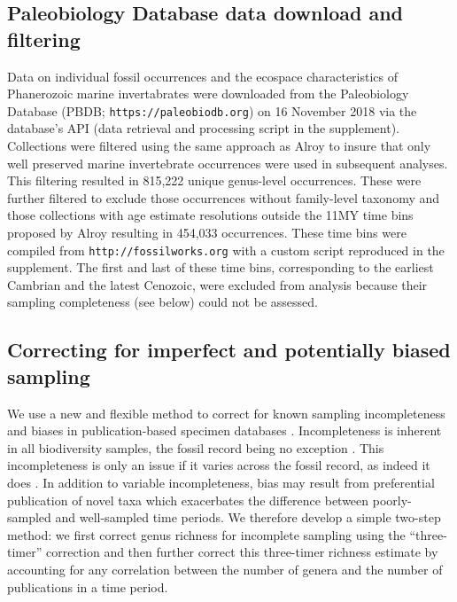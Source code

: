 \documentclass[12pt]{article}
\let\citep=\cite
\begin{document}
\subsection{Paleobiology Database data download and filtering}
Data on individual fossil occurrences and the ecospace characteristics
of Phanerozoic marine invertabrates were downloaded from the
Paleobiology Database (PBDB; {\tt https://paleobiodb.org}) on 16
November 2018 via the database's API (data retrieval and processing
script in the supplement). Collections were filtered using the same
approach as Alroy \citep{alroy08} to insure that only well preserved
marine invertebrate occurrences were used in subsequent analyses. This
filtering resulted in 815,222 unique genus-level occurrences. These
were further filtered to exclude those occurrences without
family-level taxonomy and those collections with age estimate
resolutions outside the 11MY time bins proposed by Alroy
\citep{alroy08} resulting in 454,033 occurrences. These time bins were
compiled from {\tt http://fossilworks.org} with a custom script
reproduced in the supplement. The first and last of these time bins,
corresponding to the earliest Cambrian and the latest Cenozoic, were
excluded from analysis because their sampling completeness (see below)
could not be assessed.


\subsection{Correcting for imperfect and potentially biased sampling}
\label{sec:3TP}
We use a new and flexible method to correct for known sampling
incompleteness and biases in publication-based specimen databases
\citep{alroy08, alroy2010}. Incompleteness is inherent in all
biodiversity samples, the fossil record being no exception
\citep{miller1996, foote2016, starrfelt2016, close2018}. This
incompleteness is only an issue if it varies across the fossil record,
as indeed it does \citep{miller1996 , foote2016, starrfelt2016,
  close2018}.  In addition to variable incompleteness, bias may result
from preferential publication of novel taxa \citep{alroy2010} which
exacerbates the difference between poorly-sampled and well-sampled
time periods. We therefore develop a simple two-step method: we first
correct genus richness for incomplete sampling using the
``three-timer'' correction \citep{alroy08} and then further correct
this three-timer richness estimate by accounting for any correlation
between the number of genera and the number of publications in a time
period.
\end{document}
